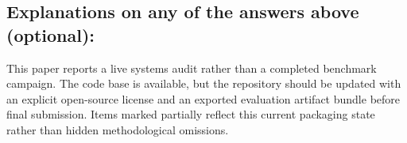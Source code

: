 \documentclass[manuscript,screen,review]{jair}
\begin{document}
\subsection*{Explanations on any of the answers above (optional):}
This paper reports a live systems audit rather than a completed benchmark campaign. The code base is available, but the repository should be updated with an explicit open-source license and an exported evaluation artifact bundle before final submission. Items marked partially reflect this current packaging state rather than hidden methodological omissions.
\end{document}
